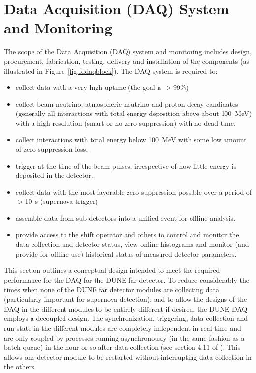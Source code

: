 \section{Data Acquisition (DAQ) System and Monitoring} 
\label{sec:detectors-fd-ref-daq}

The scope of the Data Acquisition (DAQ) system and monitoring includes design, procurement,
fabrication, testing, delivery and installation of the components (as illustrated in Figure~\ref{fig:fddaqblock}).  The DAQ system is required to:
\begin{itemize}
\item collect data with a very high uptime (the goal is $>$99\%)
\item collect beam neutrino, atmospheric neutrino and proton
  decay candidates (generally all interactions with total energy deposition
  above about 100~MeV) with a high resolution (smart or no
  zero-suppression) with no dead-time. 
\item collect interactions with total energy
  below 100~MeV with some
 low amount of zero-suppression loss.
\item trigger at the time of the beam pulses,
  irrespective of how little energy is deposited in the detector.
\item collect data with the most favorable zero-suppression possible over a
  period of $>$10~s (supernova trigger)
\item assemble data from sub-detectors into a unified
  event for offline analysis.
\item provide access to the shift operator and others to control and
  monitor the data collection and detector status, view online
  histograms and monitor (and provide for offline use) historical
  status of measured detector parameters. 
\end{itemize}

This section outlines a conceptual design intended to meet the
required performance for the DAQ for the DUNE far detector.  To reduce
considerably the times when none of the DUNE far detector modules are collecting
data (particularly important for supernova detection); and to allow
the designs of the DAQ in the different  modules to be entirely
different if desired, the DUNE DAQ employs a decoupled design.
The synchronization, triggering, data collection and run-state in the
different  modules are completely independent in real time and
are only coupled by processes running asynchronously (in the same fashion
as a batch queue) in the hour or so after data collection (see section
4.11 of \anxlbnefd).  This allows one %
detector module to be restarted without interrupting data collection in the
others. %

